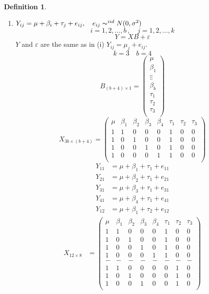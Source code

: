\documentclass[11pt,a4paper]{article}
\theoremstyle{definition}
\newtheorem{defn}[thm]{Definition}
\begin{document}
\begin{defn}
\begin{enumerate}
\item[ii).] $Y_{ij} = \mu + \beta_i +\tau_j+e_{ij},\quad  e_{ij}\thicksim^{iid} N(0,\sigma^2)$
$$i=1,2,\ldots , b\,, \quad  j=1,2,\ldots ,k$$
$$Y=XB+\varepsilon$$
$Y$ and $\varepsilon$ are the same as in (i) $Y_{ij}=\mu_j+e_{ij}$.
$$k=3\quad  b=4$$
$$B_{(b+4)\times 1}=
\begin{pmatrix}
\mu\\ \beta_1\\ \vdots\vdots\\  \beta_b\\ \tau_1\\ \tau_2\\ \tau_3\\
\end{pmatrix}
$$
$$X_{3b\times (b+4)}=
\begin{pmatrix}
\mu & \beta_1 & \beta_2 & \beta_3 & \beta_4 & \tau_1 & \tau_2 & \tau_3\\
1 & 1 & 0 & 0 & 0 & 1 & 0 & 0\\
1 & 0 & 1 & 0 & 0 & 1 & 0 & 0\\
1 & 0 & 0 & 1 & 0 & 1 & 0 & 0\\
1 & 0 & 0 & 0 & 1 & 1 & 0 & 0\\
\end{pmatrix}
$$
\begin{align*}
Y_{11} & = \mu + \beta_1 + \tau_1 + e_{11}\\
Y_{21} & = \mu + \beta_2 + \tau_1 + e_{21}\\
Y_{31} & = \mu + \beta_3 + \tau_1 + e_{31}\\
Y_{41} & = \mu + \beta_4 + \tau_1 + e_{41}\\
Y_{12} & = \mu + \beta_1 + \tau_2 + e_{12}
\end{align*}
\begin{align*}
X_{12\times 8} & =
\begin{pmatrix}
\mu & \beta_1 & \beta_2 & \beta_3 & \beta_4 & \tau_1 & \tau_2 & \tau_3\\
1 & 1 & 0 & 0 & 0 & 1 & 0 & 0 \\
1 & 0 & 1 & 0 & 0 & 1 & 0 & 0\\
1 & 0 & 0 & 1 & 0 & 1 & 0 & 0\\
1 & 0 & 0 & 0 & 1 & 1 & 0 & 0\\
- & - & - & - & - & - & - & -\\
1 & 1 & 0 & 0 & 0 & 0 & 1 & 0\\
1 & 0 & 1 & 0 & 0 & 0 & 1 & 0\\
1 & 0 & 0 & 1 & 0 & 0 & 1 & 0\\

\end{pmatrix}
\end{align*}
\end{enumerate}
\end{defn}
\end{document}
